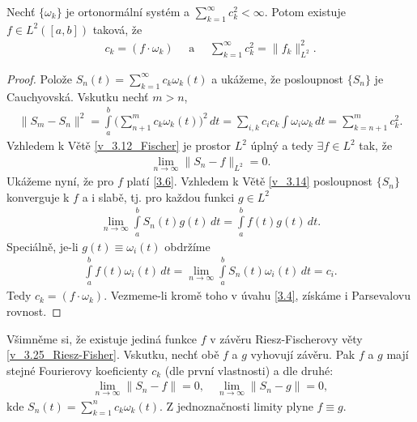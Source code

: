 \begin{theorem}\label{v_3.25_Riesz-Fisher}
Nechť $\{ \omega_k \}$ je ortonormální systém a $\sum \limits _{k=1}^{\infty} c_k^2 < \infty$. Potom existuje $f \in L^2([a,b])$ taková, že
\begin{align}\label{3.6}
c_k = (f \cdot \omega_k ) \quad \textrm{ a } \quad \sum \limits _{k=1}^{\infty} c_k^2 = \|f_k\|_{L^2}^2.
\end{align}
\end{theorem}
\begin{proof}
Polože $S_n (t) = \sum \limits _{k=1}^{\infty} c_k \omega_k(t)$ a ukážeme, že posloupnost $\{S_n\}$ je Cauchyovská. Vskutku nechť $m > n$,
\begin{align*}
\|S_m - S_n\|^2 = \int \limits_a^b \Big(\sum \limits _{n+1}^m c_k \omega_k (t)\Big)^2 \, dt = \sum \limits _{i,k} c_i c_k \int \limits \omega_i \omega_k \, dt = \sum \limits _{k = n+1}^m c_k^2.
\end{align*}
Vzhledem k Větě \ref{v_3.12_Fischer} je prostor $L^2$ úplný a tedy $\exists f \in L^2$ tak, že
\begin{align*}
\lim_{n \rightarrow \infty} \|S_n - f\|_{L^2} = 0.
\end{align*}
Ukážeme nyní, že pro $f$ platí \ref{3.6}. Vzhledem k Větě \ref{v_3.14} posloupnost $\{S_n\}$ konverguje k $f$ a i slabě, tj. pro každou funkci $g \in L^2$
\begin{align*}
\lim_{n \rightarrow \infty} \int \limits_a^b S_n(t) g(t) \, dt = \int \limits_a^b f(t) g(t)\, dt.
\end{align*}
Speciálně, je-li $g(t) \equiv \omega_i (t)$ obdržíme
\begin{align*}
\int \limits_a^b f(t) \omega_i (t)\, dt = \lim_{n \rightarrow \infty} \int \limits_a^b S_n(t) \omega_i (t)\, dt = c_i.
\end{align*}
Tedy $c_k = (f \cdot \omega_k)$. Vezmeme-li kromě toho v úvahu \ref{3.4}, získáme i Parsevalovu rovnost.
\end{proof}


\begin{poznamka}\label{2.26.poznamka}
Všimněme si, že existuje jediná funkce $f$ v závěru Riesz-Fischerovy věty \ref{v_3.25_Riesz-Fisher}. Vskutku, nechť obě $f$ a $g$ vyhovují závěru. Pak $f$ a $g$ mají stejné Fourierovy koeficienty $c_k$ (dle první vlastnosti) a dle druhé:
\begin{align*}
\lim \limits _{n \to \infty} \|S_n - f\| = 0, \quad \lim \limits _{n \to \infty} \|S_n - g\| = 0,
\end{align*}
kde $S_n(t) = \sum \limits _{k=1}^n c_k \omega_k(t)$. Z jednoznačnosti limity plyne $f \equiv g$.
\end{poznamka}

